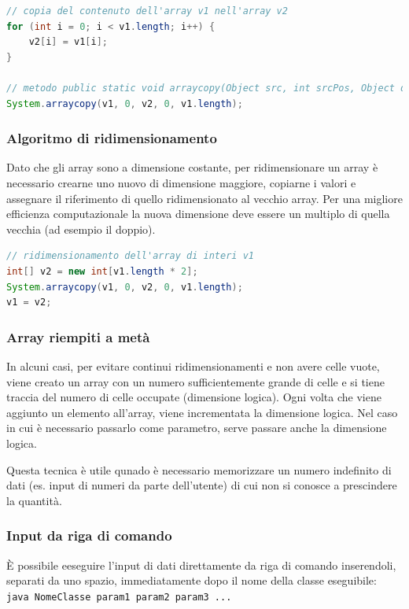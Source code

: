 \documentclass[a4paper]{article}
\begin{document}
\begin{lstlisting}[language=Java]
// copia del contenuto dell'array v1 nell'array v2
for (int i = 0; i < v1.length; i++) {
	v2[i] = v1[i];
}

// metodo public static void arraycopy(Object src, int srcPos, Object dest, int destPos, int length)
System.arraycopy(v1, 0, v2, 0, v1.length);
\end{lstlisting}

\subsubsection*{Algoritmo di ridimensionamento}
Dato che gli array sono a dimensione costante, per ridimensionare un array è necessario crearne uno nuovo di dimensione maggiore,
copiarne i valori e assegnare il riferimento di quello ridimensionato al vecchio array. Per una migliore efficienza computazionale
la nuova dimensione deve essere un multiplo di quella vecchia (ad esempio il doppio).

\begin{lstlisting}[language=Java]
// ridimensionamento dell'array di interi v1
int[] v2 = new int[v1.length * 2];
System.arraycopy(v1, 0, v2, 0, v1.length);
v1 = v2;
\end{lstlisting}

\subsubsection*{Array riempiti a metà}
In alcuni casi, per evitare continui ridimensionamenti e non avere celle vuote, viene creato un array con un numero sufficientemente
grande di celle e si tiene traccia del numero di celle occupate (dimensione logica). Ogni volta che viene aggiunto un elemento
all'array, viene incrementata la dimensione logica. Nel caso in cui è necessario passarlo come parametro, serve passare anche
la dimensione logica.

Questa tecnica è utile qunado è necessario memorizzare un numero indefinito di dati (es. input di numeri da parte dell'utente)
di cui non si conosce a prescindere la quantità.

\subsubsection*{Input da riga di comando}
È possibile eeseguire l'input di dati direttamente da riga di comando inserendoli, separati da uno spazio, immediatamente dopo
il nome della classe eseguibile: \verb|java NomeClasse param1 param2 param3 ...|
\end{document}
